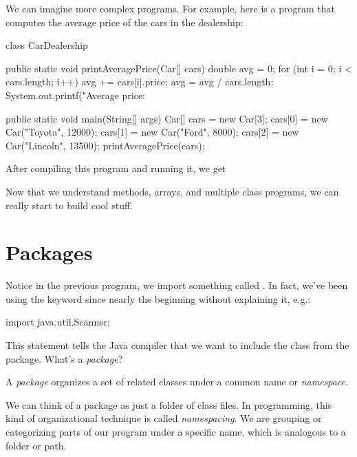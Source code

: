 We can imagine more complex programs. For example, here is a program that computes the average price of the cars in the dealership:

\begin{code}
class CarDealership {
  
  public static void printAveragePrice(Car[] cars) {
    double avg = 0;
    for (int i = 0; i < cars.length; i++) {
      avg += cars[i].price;
    }
    avg = avg / cars.length;
    System.out.printf("Average price: %
  }
    
  public static void main(String[] args) {
    Car[] cars = new Car[3];
    cars[0] = new Car("Toyota", 12000);
    cars[1] = new Car("Ford", 8000);
    cars[2] = new Car("Lincoln", 13500);
    printAveragePrice(cars);
  }
}
\end{code}

After compiling this program and running it, we get


Now that we understand methods, arrays, and multiple class programs, we can really start to build cool stuff.

\section{Packages}

Notice in the previous  program, we import something called . In fact, we've been using the  keyword since nearly the beginning without explaining it, e.g.:

\begin{code}
import java.util.Scanner;
\end{code}

This  statement tells the Java compiler that we want to include the  class from the  package. What's a \emph{package}?

\begin{definition}
A \emph{package} organizes a set of related classes under a common name or \emph{namespace}.
\end{definition}

We can think of a package as just a folder of class files. In programming, this kind of organizational technique is called \emph{namespacing}. We are grouping or categorizing parts of our program under a specific name, which is analogous to a folder or path.

